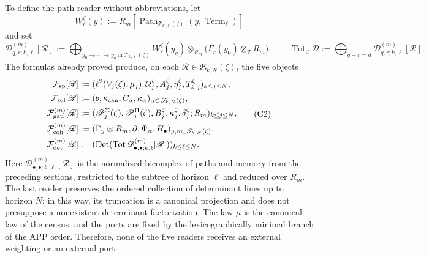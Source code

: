 To define the path reader without abbreviations, let
\[
 W_\ell^\zeta(y):=
 R_m[\operatorname{Path}_{\mathscr T_{k,\ell}(\zeta)}
          (y,\operatorname{Term}_\ell)]
\]
and set
\[
 \mathscr D_{q,r;k,\ell}^{(m)}[\mathscr R]
 :=\bigoplus_{y_0\to\cdots\to y_q\ \text{in}\
                  \mathscr T_{k,\ell}(\zeta)}
 W_\ell^\zeta(y_q)\otimes_{R_m}
 \bigl(\Gamma_r(y_0)\otimes_{\mathbb Z}R_m\bigr),
 \qquad
 \operatorname{Tot}_d\mathscr D
 :=\bigoplus_{q+r=d}\mathscr D_{q,r;k,\ell}^{(m)}[\mathscr R].
\]
The formulas already proved produce, on each
\(\mathscr R\in\mathfrak R_{k,N}(\zeta)\), the five objects
\[
\begin{aligned}
 \mathcal F_{\rm sp}[\mathscr R]
 &:=(\ell^2(V_j(\zeta),\mu_j),
       \mathcal U_j^\zeta,A_j^\zeta,\eta_j^\zeta,
       T_{k,j}^\zeta)_{k\leq j\leq N},\\
 \mathcal F_{\rm sol}[\mathscr R]
 &:=(b,\kappa_{\rm can},C_\alpha,\kappa_\alpha)
      _{\alpha\subset\mathscr T_{k,N}(\zeta)},\\
 \mathcal F_{\rm gau}^{(m)}[\mathscr R]
 &:=(\mathscr P_j^\Sigma(\zeta),\mathscr P_j^\Pi(\zeta),
       B_j^\zeta,\kappa_j^\zeta,\delta_j^\zeta;R_m)_{k\leq j\leq N},\\
 \mathcal F_{\rm coh}^{(m)}[\mathscr R]
 &:=(\Gamma_y\otimes R_m,\partial,\Psi_\alpha,H_\bullet)
      _{y,\alpha\subset\mathscr T_{k,N}(\zeta)},\\
 \mathcal F_{\rm det}^{(m)}[\mathscr R]
 &:=(\operatorname{Det}(\operatorname{Tot}
       \mathscr D_{\bullet,\bullet;k,\ell}^{(m)}[\mathscr R]))
       _{k\leq\ell\leq N}.
\end{aligned}
\tag{C2}
\label{eq:cinco-lectores-comunes}
\]
Here \(\mathscr D_{\bullet,\bullet;k,\ell}^{(m)}[\mathscr R]\) is the normalized
bicomplex
of paths and memory from the preceding sections, restricted to the subtree of
horizon \(\ell\) and reduced over \(R_m\). The last reader preserves the
ordered collection of determinant lines up to horizon \(N\); in this
way, its truncation is a canonical projection and does not presuppose a
nonexistent determinant factorization. The law \(\mu\) is the canonical law
of the census, and the ports are fixed by the lexicographically minimal branch
of the APP order. Therefore, none of the five readers receives an external weighting
or an external port.

